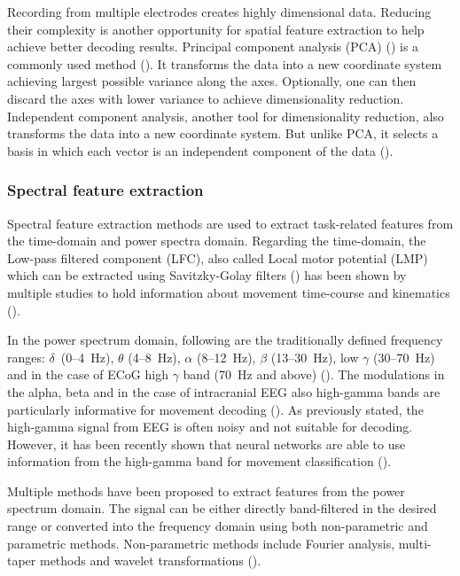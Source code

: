 Recording from multiple electrodes creates highly dimensional data. Reducing their complexity is another opportunity for spatial feature extraction to help achieve better decoding results. Principal component analysis (PCA) (\cite{pca}) is a commonly used method (\cite{volkova-review}). It transforms the data into a new coordinate system achieving largest possible variance along the axes. Optionally, one can then discard the axes with lower variance to achieve dimensionality reduction. Independent component analysis, another tool for dimensionality reduction, also transforms the data into a new coordinate system. 
But unlike PCA, it selects a basis in which each vector is an independent component of the data (\cite{ica}).

\subsubsection{Spectral feature extraction}
Spectral feature extraction methods are used to extract task-related features from the time-domain and power spectra domain. Regarding the time-domain, the Low-pass filtered component (LFC), also called Local motor potential (LMP) which can be extracted using Savitzky-Golay filters (\cite{multitaper-31}) has been shown by multiple studies to hold information about movement time-course and kinematics (\cite{schalk-2007, Pistohl2008PredictionOA, ball-2019}). 

In the power spectrum domain, following are the traditionally defined frequency ranges: $\delta$~(0–4~Hz), $\theta$ (4–8~Hz), $\alpha$ (8–12~Hz), $\beta$ (13–30~Hz), low $\gamma$ (30–70~Hz) and in the case of ECoG high $\gamma$ band (70~Hz and above) (\cite{hammer-predominance-2016}). The modulations in the alpha, beta and in the case of intracranial EEG also high-gamma bands are particularly informative for movement decoding (\cite{ball-hg-importance, 34-gunduz-hg}). As previously stated, the high-gamma signal from EEG is often noisy and not suitable for decoding. However, it has been recently shown that neural networks are able to use information from the high-gamma band for movement classification (\cite{schirrmeister-deep-2017}).

 Multiple methods have been proposed to extract features from the power spectrum domain. 
 The signal can be either directly band-filtered in the desired range or converted into the frequency domain using both non-parametric and parametric methods. 
 Non-parametric methods include Fourier analysis, multi-taper methods and wavelet transformations (\cite{volkova-review}). 

